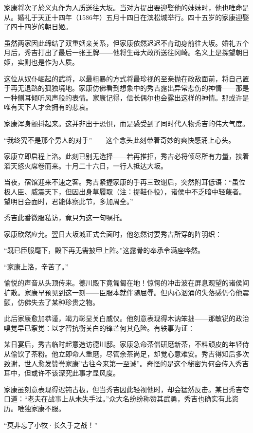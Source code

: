 \documentclass[
]{article}
\begin{document}
家康将次子於义丸作为人质送往大坂。当对方提出要迎娶他的妹妹时，他也唯命是从。婚礼于天正十四年（1586年）五月十四日在滨松城举行。四十五岁的家康迎娶了四十四岁的朝日姬。

虽然两家因此缔结了双重姻亲关系，但家康依然迟迟不肯动身前往大坂。婚礼五个月后，秀吉打出了最后一张王牌------他将生母大政所送往冈崎。名义上是探望朝日姬，实则也是作为人质。

这位从奴仆崛起的武将，以最粗暴的方式将最珍视的至亲抛在政敌面前，将自己置于再无退路的孤独境地。家康仿佛看到想象中的秀吉露出异常悲伤的神情------那是一种侧耳倾听风声般的表情。家康记得，信长偶尔也会露出这样的神情。那或许是唯有天下人才会拥有的悲哀。

家康浑身颤抖起来。这并非出于恐惧，而是感受到了同时代人物秀吉的伟大气度。

``我终究不是那个男人的对手''------这个念头此刻带着奇妙的爽快感涌上心头。

家康立即启程上洛。此刻已别无选择------若再推拒，秀吉必将倾尽所有力量，挟着滔天怒火席卷而来。十月二十六日，一行人抵达大坂。

当夜，宿馆迎来不速之客。秀吉紧握家康的手再三致谢后，突然附耳低语：``虽位极人臣、威震天下，但因出身草履取（注：提鞋仆役），诸侯中不乏暗中轻蔑者。望明日会面时，君能体察此节，多加周全。''

秀吉此番微服私访，竟只为这一句嘱托。

家康欣然应允。翌日大坂城正式会面时，他忽然讨要秀吉所穿的阵羽织：

``既已臣服麾下，殿下再无需披甲上阵。''这露骨的奉承令满座哗然。

``家康上洛，辛苦了。''

愉悦的声音从头顶传来。德川殿下竟匍匐在地！惊愕的冲击波在屏息观望的诸侯间扩散。家康早预见到这一刻------臣服本就伴随屈辱。但内心汹涌的失落感仍令他震颤，仿佛失去了某种珍贵之物。

此后家康愈加恭谨，竭力彰显关白威仪。他刻意表现得木讷笨拙------那敏锐的政治嗅觉早已察觉：以才智抗衡关白的锋芒何其危险。有轶事为证：

某日宴后，秀吉临时起意造访德川邸。家康急命茶僧研磨新茶，不料顽皮的年轻侍从偷饮了茶粉。他立即命人重磨，尽管余茶尚足，却觉心意难安。秀吉得知后多次致谢，世人愈发赞誉家康''古往今来第一至诚''。奇怪的是这个秘密为何会传入秀吉耳中，但或许不该深究此事才显风度。

家康虽刻意表现得迟钝古板，但当秀吉因此轻视他时，却会猛然反击。某日秀吉夸口道：``老夫在战事上从未失手过。''众大名纷纷称赞其武勇，秀吉也确实有此资历。唯独家康不服。

``莫非忘了小牧·长久手之战！''
\end{document}
